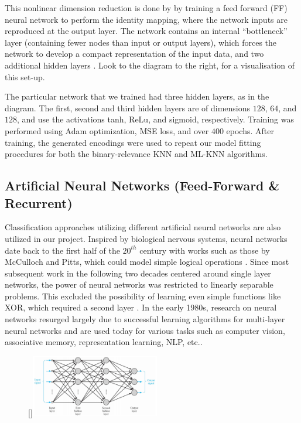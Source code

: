 \documentclass[11pt]{article}
\begin{document}
This nonlinear dimension reduction is done by by training a feed forward (FF) neural network to perform the identity mapping, where the network inputs are reproduced at the output layer. The network contains an internal “bottleneck” layer (containing fewer nodes than input or output layers), which forces the network to develop a compact representation of the input data, and two additional hidden layers \autocite{Kramer}. Look to the diagram to the right, for a visualisation of this set-up. 

The particular network that we trained had three hidden layers, as in the diagram. The first, second and third hidden layers are of dimensions $128$, $64$, and $128$, and use the activations tanh, ReLu, and sigmoid, respectively. Training was performed using Adam optimization, MSE loss, and over $400$ epochs. After training, the generated encodings were used to repeat our model fitting procedures for both the binary-relevance KNN and ML-KNN algorithms. 


\subsection{Artificial Neural Networks (Feed-Forward \& Recurrent)}
Classification approaches utilizing different artificial neural networks are also utilized in our project. Inspired by biological nervous systems, neural networks date back to the first half of the $20^{th}$ century with works such as those by McCulloch and Pitts, which could model simple logical operations \autocite{Piccinini}. Since most subsequent work in the following two decades centered around single layer networks, the power of neural networks was restricted to linearly separable problems. This excluded the possibility of learning even simple functions like XOR, which required a second layer \autocite{NNLM}. In the early 1980s, research on neural networks resurged largely due to successful learning algorithms for multi-layer neural networks and are used today for various tasks such as computer vision, associative memory, representation learning, NLP, etc..

\begin{figure}
    \begin{center}
        \raisebox{0pt}[\dimexpr{}\baselineskip\relax]{\includegraphics[width=0.5\textwidth]{multilayer_network_Haykin.png}}
    \end{center}
\end{figure}
\end{document}
